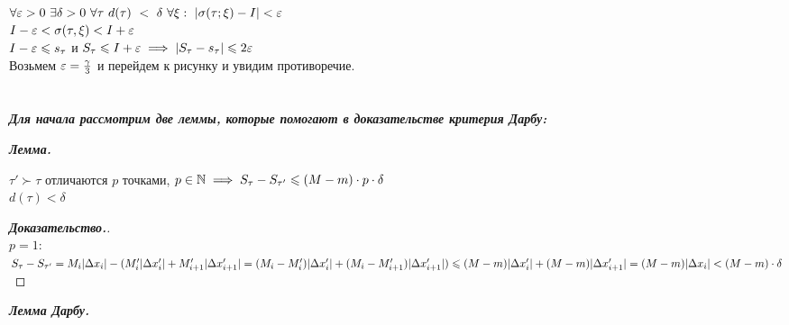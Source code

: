 \begin{Proof}
\begin{center}
\end{center}

$\forall\varepsilon > 0~\exists\delta > 0~\forall\tau~d(\tau)~ <~\delta~ \forall\xi:~|\sigma(\tau;\xi) - I| < \varepsilon$\\
$I - \varepsilon < \sigma(\tau, \xi) < I + \varepsilon$\\
$I - \varepsilon \leqslant s_\tau$ и $S_\tau \leqslant I + \varepsilon \implies |S_\tau - s_\tau| \leqslant 2\varepsilon$\\
Возьмем $\varepsilon = \frac{\gamma}{3}$ и перейдем к рисунку и увидим противоречие.\\

    
    \noindent {\Huge \textbf{\#}}\quad\\
    \\
\textbf{\textit{Для начала рассмотрим две леммы, которые помогают в доказательстве критерия Дарбу:}}

\textit{\textbf{ Лемма.}}

$\tau' \succ \tau$ отличаются $p$ точками, $p \in \mathbb{N} \implies S_\tau - S_{\tau'} \leqslant (M - m)\cdot p\cdot\delta$\\
$d(\tau) < \delta$\\

\begin{proof}[\textbf{Доказательство.}]
    

\noindent\\
$p = 1$:\\
$S_\tau - S_{\tau'} = M_i|\Delta x_i| - (M'_i|\Delta x'_i| + M'_{i+1}|\Delta x'_{i+1}| = (M_i - M'_i)|\Delta x'_i| + (M_i - M'_{i+1})|\Delta x'_{i+1}|) \leqslant (M - m)|\Delta x'_{i}| + (M - m)|\Delta x'_{i+1}| = (M - m)|\Delta x_{i}| < (M - m)\cdot\delta$\\
\end{proof}
\bigskip

\textit{\textbf{ Лемма Дарбу.}}


\end{Proof}

